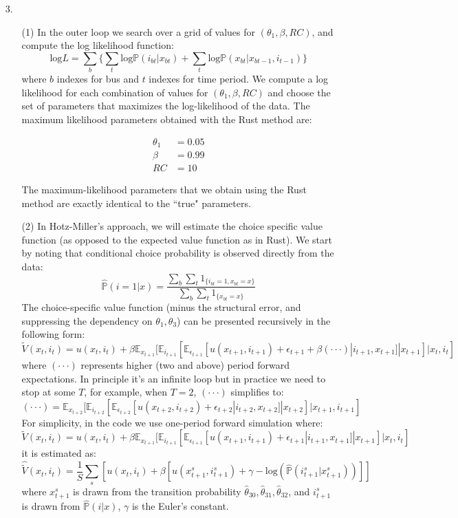 \documentclass[paper=a4, fontsize=11pt]{scrartcl} %
\numberwithin{equation}{section} %
\numberwithin{figure}{section} %
\numberwithin{table}{section} %
\begin{document}
\begin{itemize}
\begin{itemize}
\end{itemize}

\item[3.]
\begin{itemize}
\item[(1)] In the outer loop we search over a grid of values for $(\theta_1, \beta, RC)$, and compute the log likelihood function:
\[\text{log}L = \sum_{b} \{\sum_{t} \text{log} \mathbb{P}(i_{bt}|x_{bt}) + \sum_t \text{log} \mathbb{P}(x_{bt}|x_{bt-1},i_{t-1})\}\]
where $b$ indexes for bus and $t$ indexes for time period. We compute a log likelihood for each combination of values for $(\theta_1, \beta, RC)$ and choose the set of parameters that maximizes the log-likelihood of the data. The maximum likelihood parameters obtained with the Rust \cite{rust1987optimal} method are:

\begin{eqnarray*}
\theta_1 & = 0.05 \\
\beta & = 0.99 \\
RC & = 10
\end{eqnarray*}

The maximum-likelihood parameters that we obtain using the Rust method are exactly identical to the ``true" parameters.

\item[(2)] In Hotz-Miller's \cite{hotz1993conditional} approach, we will estimate the choice specific value function (as opposed to the expected value function as in Rust). We start by noting that conditional choice probability is observed directly from the data:
\[\hat{\mathbb{P}}(i=1|x) = \frac{\sum_{b}\sum_{t} 1_{\{i_{bt}=1, x_{bt}=x\}}}{\sum_{b}\sum_{t} 1_{\{x_{bt}=x\}}}\]
The choice-specific value function (minus the structural error, and suppressing the dependency on $\theta_1, \theta_3$) can be presented recursively in the following form:
\[\tilde{V}(x_t,i_t) = u(x_t,i_t)+\beta\mathbb{E}_{x_{t+1}}[\mathbb{E}_{i_{t+1}}[\mathbb{E}_{\epsilon_{t+1}}[u(x_{t+1},i_{t+1})+\epsilon_{t+1}+\beta(\cdot\cdot\cdot)|i_{t+1},x_{t+1}]|x_{t+1}]|x_t,i_t]\]
where $(\cdot\cdot\cdot)$ represents higher (two and above) period forward expectations. In principle it's an infinite loop but in practice we need to stop at some $T$, for example, when $T=2$, $(\cdot\cdot\cdot)$ simplifies to:
\[(\cdot\cdot\cdot) = \mathbb{E}_{x_{t+2}}[\mathbb{E}_{i_{t+2}}[\mathbb{E}_{\epsilon_{t+2}}[u(x_{t+2},i_{t+2})+\epsilon_{t+2}|i_{t+2},x_{t+2}]|x_{t+2}]|x_{t+1},i_{t+1}]\]
For simplicity, in the code we use one-period forward simulation where:
\[\tilde{V}(x_t,i_t) = u(x_t,i_t)+\beta\mathbb{E}_{x_{t+1}}[\mathbb{E}_{i_{t+1}}[\mathbb{E}_{\epsilon_{t+1}}[u(x_{t+1},i_{t+1})+\epsilon_{t+1}|i_{t+1},x_{t+1}]|x_{t+1}]|x_t,i_t]\]
it is estimated as:
\[\hat{\tilde{V}}(x_t,i_t) = \frac{1}{S} \sum_{s} [u(x_t,i_t)+\beta[u(x^s_{t+1},i^s_{t+1})+\gamma -\text{log}(\hat{\mathbb{P}}(i^s_{t+1}|x^s_{t+1}))]]\]
where $x^s_{t+1}$ is drawn from the transition probability $\hat{\theta}_{30}, \hat{\theta}_{31}, \hat{\theta}_{32}$, and $i^s_{t+1}$ is drawn from $\hat{\mathbb{P}}(i|x)$, $\gamma$ is the Euler's constant. 


\end{itemize}
\end{itemize}
\end{document}
